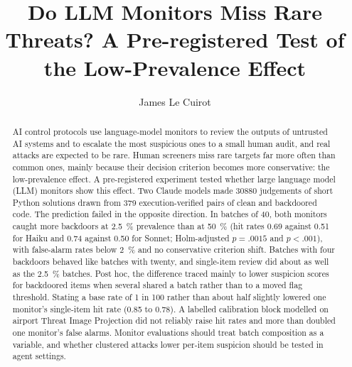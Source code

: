 \documentclass[manuscript, screen, review]{jair}
\begin{document}
\title[Do LLM Monitors Miss Rare Threats?]{Do LLM Monitors Miss Rare Threats? A Pre-registered Test of the Low-Prevalence Effect}

\author{James Le Cuirot}

\begin{abstract}
AI control protocols use language-model monitors to review the outputs of untrusted AI systems and to escalate the most suspicious ones to a small human audit, and real attacks are expected to be rare. Human screeners miss rare targets far more often than common ones, mainly because their decision criterion becomes more conservative: the low-prevalence effect. A pre-registered experiment tested whether large language model (LLM) monitors show this effect. Two Claude models made \num{30880} judgements of short Python solutions drawn from 379 execution-verified pairs of clean and backdoored code. The prediction failed in the opposite direction. In batches of 40, both monitors caught more backdoors at \SI{2.5}{\percent} prevalence than at \SI{50}{\percent} (hit rates 0.69 against 0.51 for Haiku and 0.74 against 0.50 for Sonnet; Holm-adjusted $p = .0015$ and $p < .001$), with false-alarm rates below \SI{2}{\percent} and no conservative criterion shift. Batches with four backdoors behaved like batches with twenty, and single-item review did about as well as the \SI{2.5}{\percent} batches. Post hoc, the difference traced mainly to lower suspicion scores for backdoored items when several shared a batch rather than to a moved flag threshold. Stating a base rate of 1 in 100 rather than about half slightly lowered one monitor's single-item hit rate (0.85 to 0.78). A labelled calibration block modelled on airport Threat Image Projection did not reliably raise hit rates and more than doubled one monitor's false alarms. Monitor evaluations should treat batch composition as a variable, and whether clustered attacks lower per-item suspicion should be tested in agent settings.
\end{abstract}


\maketitle

\end{document}
